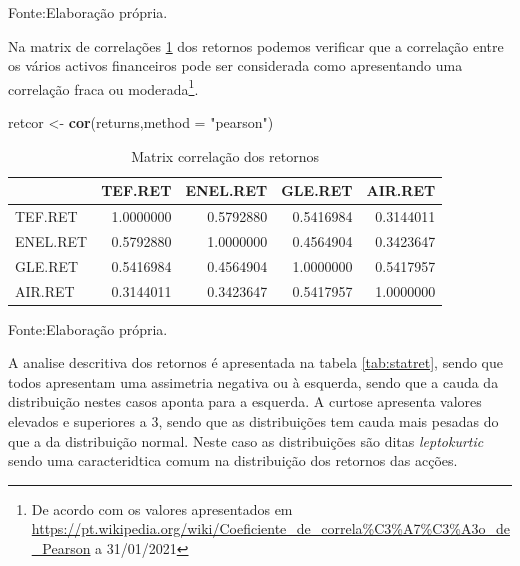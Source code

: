 \documentclass[
  12pt,
  a4paper,
  openany]{book}
\newenvironment{Shaded}{\begin{snugshade}}{\end{snugshade}}
\newcommand{\DataTypeTok}[1]{\textcolor[rgb]{0.13,0.29,0.53}{#1}}
\newcommand{\KeywordTok}[1]{\textcolor[rgb]{0.13,0.29,0.53}{\textbf{#1}}}
\newcommand{\NormalTok}[1]{#1}
\newcommand{\StringTok}[1]{\textcolor[rgb]{0.31,0.60,0.02}{#1}}
\begin{document}
Fonte:Elaboração própria.

\justifying
\bigskip

Na matrix de correlações \ref{tab:correl} dos retornos podemos verificar que a correlação entre os vários activos financeiros pode ser considerada como apresentando uma correlação fraca ou moderada\footnote{De acordo com os valores apresentados em \url{https://pt.wikipedia.org/wiki/Coeficiente_de_correla\%C3\%A7\%C3\%A3o_de_Pearson} a 31/01/2021}.

\scriptsize

\begin{Shaded}
\begin{Highlighting}[]
\NormalTok{retcor \textless{}{-}}\StringTok{ }\KeywordTok{cor}\NormalTok{(returns,}\DataTypeTok{method =} \StringTok{"pearson"}\NormalTok{)}
\end{Highlighting}
\end{Shaded}

\normalsize

\begin{table}[!h]

\caption{\label{tab:correl}Matrix correlação dos retornos}
\centering
\begin{tabular}[t]{lrrrr}
\toprule
  & TEF.RET & ENEL.RET & GLE.RET & AIR.RET\\
\midrule
TEF.RET & 1.0000000 & 0.5792880 & 0.5416984 & 0.3144011\\
ENEL.RET & 0.5792880 & 1.0000000 & 0.4564904 & 0.3423647\\
GLE.RET & 0.5416984 & 0.4564904 & 1.0000000 & 0.5417957\\
AIR.RET & 0.3144011 & 0.3423647 & 0.5417957 & 1.0000000\\
\bottomrule
\end{tabular}
\end{table}
\FloatBarrier
\centering

Fonte:Elaboração própria.

\justifying
\bigskip

A analise descritiva dos retornos é apresentada na tabela \ref{tab:statret}, sendo que todos apresentam uma assimetria negativa ou à esquerda, sendo que a cauda da distribuição nestes casos aponta para a esquerda. A curtose apresenta valores elevados e superiores a 3, sendo que as distribuições tem cauda mais pesadas do que a da distribuição normal. Neste caso as distribuições são ditas \emph{leptokurtic} sendo uma caracteridtica comum na distribuição dos retornos das acções.
\end{document}
